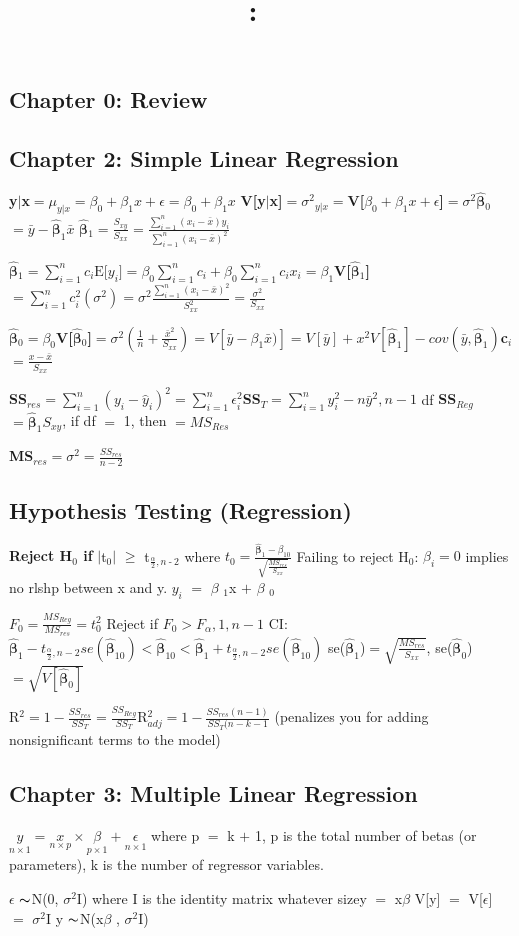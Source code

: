 \documentclass[8pt]{extarticle}
\title{
    \vspace{2in}
    \textmd{\textbf{\hmwkClass:\ \hmwkTitle}}\\
    \normalsize\vspace{0.1in}\small\vspace{0.1in}\large{\textit{\hmwkClassInstructor}}
    \vspace{3in}
}
\author{\hmwkAuthorName}
\date{}
\newcommand{\mt}[1]{\ensuremath{#1}}
\newcommand\ssc[2][\DefaultOpt]{%
  \def\DefaultOpt{#2}%
  \subsection[#1]{#2}%
}
\newcommand{\ep}{\mt{\epsilon} }         %
\newcommand{\afa}{\mt{\alpha} }
\newcommand{\bta}{\mt{\beta} }
\newcommand{\av}[1]{\mt{|}#1\mt{|}}  %
\newcommand{\ps}{\mt{\operatorname{+}} }
\newcommand{\ms}{\mt{\operatorname{-}} }
\newcommand{\gr}{\mt{\operatorname{>}} }
\newcommand{\gre}{\mt{\operatorname{\geq}} }
\newcommand{\eql}{ \mt{\operatorname{=}} }
\newcommand{\uw}[2]{#1\mt{_{#2}}}
\newcommand{\uf}[2]{#1\mt{^{#2}}}
\newcommand{\frc}[2]{\mt{\frac{#1}{#2}}}
\newcommand{\txt}[1]{\text{#1}} %
\newcommand{\tl}{\mt{\thicksim}}
\newcommand{\ssq}{\mt{\sigma^2}}
\newcommand{\bh}[1]{\mathbf{\hat{\text{$#1$}}}}
\newcommand{\bth}{\mt{\bh{\beta}}}
\newcommand{\exv}[1]{\txt{E[}#1\txt{]}}
\newcommand{\vrn}[1]{V[#1]}
\newcommand\tab[1][1cm]{\hspace*{#1}}
\newcommand{\unds}[2]{\mt{\underset{#1}{#2}}} %
\begin{document}
\ssc{Chapter 0: Review}{

}
\ssc{Chapter 2: Simple Linear Regression}{
\textbf{\exv{y$|$x}}$=\mu_{y|x}=$\exv{$\beta_0+\beta_1x+\epsilon$}$=\beta_0+\beta_1x$ \tab \textbf{\vrn{y$|$x}}$=\ssq_{y|x}=$\textbf{\vrn{$\beta_0+\beta_1x+\epsilon$}}$=\ssq$\tab \textbf{\uw{\bth}{0}}$=\bar y - \bth_1\bar x$ \tab \textbf{\uw{\bth}{1}}$=\frac{S_{xy}}{S_{xx}}=\frac{\sum_{i = 1}^n(x_i - \bar x)y_i}{\sum_{i = 1}^n(x_i - \bar x)^2}$

\textbf{\exv{\bth$_1$}}$=\sum_{i = 1}^n c_i\exv{y_i}=\beta_0\sum_{i = 1}^nc_i + \beta_0\sum_{i = 1}^nc_ix_i=\beta_1$\tab \textbf{\vrn{\bth$_1$}}$=\sum_{i = 1}^nc_i^2(\ssq)=\ssq \frac{\sum_{i = 1}^n(x_i - \bar x)^2}{S_{xx}^2}=\frac{\ssq}{S_{xx}}$

\textbf{\exv{\bth$_0$}}$=\beta_0$\tab \textbf{\vrn{\bth$_0$}}$=\ssq(\frac{1}{n} + \frac{\bar x^2}{S_{xx}})=\vrn{\bar y - \beta_1\bar x)}=\vrn{\bar y} + x^2 \vrn{\bth_1} - cov(\bar y, \bth_1)$\tab \textbf{\uw{c}{i}}$=\frac{x - \bar x}{S_{xx}}$

\textbf{SS$_{res}$}$=\sum_{i = 1}^n(y_i - \hat y_i)^2=\sum_{i = 1}^n \epsilon_i^2$\tab \textbf{SS$_T$}$=\sum_{i = 1}^n y_i^2 - n{\bar y}^2, n-1$ df \tab \textbf{SS$_{Reg}$}$=\bth_1S_{xy}$, if df\eql1, then $=MS_{Res}$

\textbf{MS$_{res}$}$=\ssq=\frac{SS_{res}}{n - 2}$

\ssc{Hypothesis Testing (Regression)}{

\textbf{Reject \uw{H}{0} if} \av{\uw{t}{0}} \gre \uw{t}{\frc{\afa}{2}, n \ms 2} where $t_0 = \frac{\bth_1 - \bta_{10}}{\sqrt{\frac{MS_{res}}{S_{xx}}}}$ \tab Failing to reject \uw{H}{0}: $\bta_i = 0$ implies no rlshp between x and y. \tab \exv{$y_i$} \eql \uw{\bta}{1}x \ps \uw{\bta}{0}

$F_0 = \frac{MS_{Reg}}{MS_{res}} = t_0^2$ \tab Reject if $F_0 \gr F_\alpha, 1, n-1$ \tab CI: $\bth_1 - t_{\frac{\alpha}{2}, n - 2}se(\bth_{10}) < \bth_{10} < \bth_1 + t_{\frac{\alpha}{2}, n - 2}se(\bth_{10})$ \tab se($\bth_1$)$=\sqrt{\frac{MS_{res}}{S_{xx}}}$, se($\bth_0$)$=\sqrt{\vrn{\bth_0}}$

\uf{R}{2}$=1 - \frac{SS_{res}}{SS_T} = \frac{SS_{Reg}}{SS_T}$\tab R$^2_{adj} = 1 - \frac{SS_{res}(n - 1)}{SS_T(n - k - 1}$ (penalizes you for adding nonsignificant terms to the model)
}
}
\ssc{Chapter 3: Multiple Linear Regression}{

\mt{\unds{n\times1}{y} = \unds{n\times p}{x}\times\unds{p\times1}{\bta} + \unds{n\times1}{\epsilon}}
where p \eql k \ps 1, p is the total number of betas (or parameters), k is the number of regressor variables.

\ep \tl N(0, \ssq I) where I is the identity matrix whatever size\tab \exv{y} \eql x\bta \tab \vrn{y} \eql \vrn{$\epsilon$} \eql \ssq I \tab y \tl N(x\bta, \ssq I)

}
\end{document}
